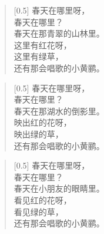 \documentclass[12pt,UTF-8,openany]{ctexbook}
\begin{document}
\begin{large}
    
    \begin{verse}[0.5\linewidth]
        春天在哪里呀， \\
        春天在哪里？ \\
        春天在那青翠的山林里。 \\
        这里有红花呀， \\
        这里有绿草， \\
        还有那会唱歌的小黄鹂。
    \end{verse}
    
    
    \begin{verse}[0.5\linewidth]
        春天在哪里呀， \\
        春天在哪里？ \\
        春天在那湖水的倒影里。 \\
        映出红的花呀， \\
        映出绿的草， \\
        还有那会唱歌的小黄鹂。
    \end{verse}
    
    
    \begin{verse}[0.5\linewidth]
        春天在哪里呀， \\
        春天在哪里？ \\
        春天在小朋友的眼睛里。 \\
        看见红的花呀， \\
        看见绿的草， \\
        还有那会唱歌的小黄鹂。
    \end{verse}
    
\end{large}


\clearpage

\begin{center}
    
    
    
\end{center}


\hanzibox{}\hanzibox{}\hanzibox{}\hanzibox{}\hspace{1em}\hanzibox{}\hanzibox{}\hanzibox{}\hanzibox{}

\hanzibox{}\hanzibox{}\hanzibox{}\hanzibox{}\hspace{1em}\hanzibox{}\hanzibox{}\hanzibox{}\hanzibox{}
\end{document}
